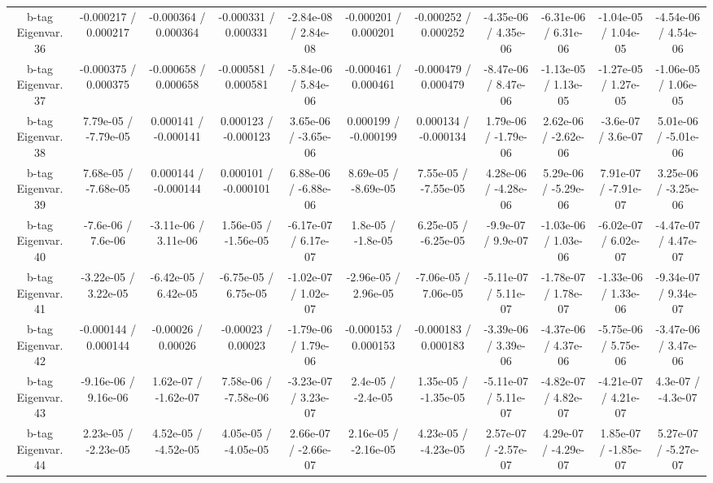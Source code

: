 \begin{table}[htbp]
\begin{center}
\begin{tabular}{|c|c|c|c|c|c|c|c|c|c|c|}
  b-tag Eigenvar. 36 & -0.000217 / 0.000217 & -0.000364 / 0.000364 & -0.000331 / 0.000331 & -2.84e-08 / 2.84e-08 & -0.000201 / 0.000201 & -0.000252 / 0.000252 & -4.35e-06 / 4.35e-06 & -6.31e-06 / 6.31e-06 & -1.04e-05 / 1.04e-05 & -4.54e-06 / 4.54e-06 \\ 
  b-tag Eigenvar. 37 & -0.000375 / 0.000375 & -0.000658 / 0.000658 & -0.000581 / 0.000581 & -5.84e-06 / 5.84e-06 & -0.000461 / 0.000461 & -0.000479 / 0.000479 & -8.47e-06 / 8.47e-06 & -1.13e-05 / 1.13e-05 & -1.27e-05 / 1.27e-05 & -1.06e-05 / 1.06e-05 \\ 
  b-tag Eigenvar. 38 & 7.79e-05 / -7.79e-05 & 0.000141 / -0.000141 & 0.000123 / -0.000123 & 3.65e-06 / -3.65e-06 & 0.000199 / -0.000199 & 0.000134 / -0.000134 & 1.79e-06 / -1.79e-06 & 2.62e-06 / -2.62e-06 & -3.6e-07 / 3.6e-07 & 5.01e-06 / -5.01e-06 \\ 
  b-tag Eigenvar. 39 & 7.68e-05 / -7.68e-05 & 0.000144 / -0.000144 & 0.000101 / -0.000101 & 6.88e-06 / -6.88e-06 & 8.69e-05 / -8.69e-05 & 7.55e-05 / -7.55e-05 & 4.28e-06 / -4.28e-06 & 5.29e-06 / -5.29e-06 & 7.91e-07 / -7.91e-07 & 3.25e-06 / -3.25e-06 \\ 
  b-tag Eigenvar. 40 & -7.6e-06 / 7.6e-06 & -3.11e-06 / 3.11e-06 & 1.56e-05 / -1.56e-05 & -6.17e-07 / 6.17e-07 & 1.8e-05 / -1.8e-05 & 6.25e-05 / -6.25e-05 & -9.9e-07 / 9.9e-07 & -1.03e-06 / 1.03e-06 & -6.02e-07 / 6.02e-07 & -4.47e-07 / 4.47e-07 \\ 
  b-tag Eigenvar. 41 & -3.22e-05 / 3.22e-05 & -6.42e-05 / 6.42e-05 & -6.75e-05 / 6.75e-05 & -1.02e-07 / 1.02e-07 & -2.96e-05 / 2.96e-05 & -7.06e-05 / 7.06e-05 & -5.11e-07 / 5.11e-07 & -1.78e-07 / 1.78e-07 & -1.33e-06 / 1.33e-06 & -9.34e-07 / 9.34e-07 \\ 
  b-tag Eigenvar. 42 & -0.000144 / 0.000144 & -0.00026 / 0.00026 & -0.00023 / 0.00023 & -1.79e-06 / 1.79e-06 & -0.000153 / 0.000153 & -0.000183 / 0.000183 & -3.39e-06 / 3.39e-06 & -4.37e-06 / 4.37e-06 & -5.75e-06 / 5.75e-06 & -3.47e-06 / 3.47e-06 \\ 
  b-tag Eigenvar. 43 & -9.16e-06 / 9.16e-06 & 1.62e-07 / -1.62e-07 & 7.58e-06 / -7.58e-06 & -3.23e-07 / 3.23e-07 & 2.4e-05 / -2.4e-05 & 1.35e-05 / -1.35e-05 & -5.11e-07 / 5.11e-07 & -4.82e-07 / 4.82e-07 & -4.21e-07 / 4.21e-07 & 4.3e-07 / -4.3e-07 \\ 
  b-tag Eigenvar. 44 & 2.23e-05 / -2.23e-05 & 4.52e-05 / -4.52e-05 & 4.05e-05 / -4.05e-05 & 2.66e-07 / -2.66e-07 & 2.16e-05 / -2.16e-05 & 4.23e-05 / -4.23e-05 & 2.57e-07 / -2.57e-07 & 4.29e-07 / -4.29e-07 & 1.85e-07 / -1.85e-07 & 5.27e-07 / -5.27e-07 \\ 

\end{tabular}
\end{center}
\end{table}
